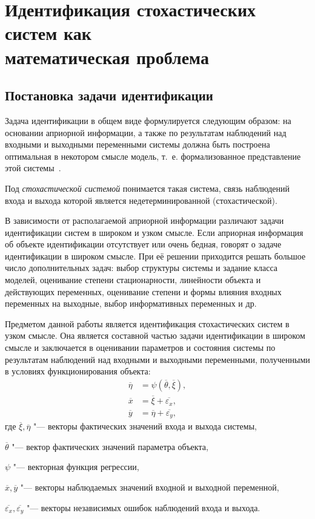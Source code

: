 \section[Идентификация стохастических систем как математическая проблема]{%
  Идентификация стохастических систем как \\
  математическая проблема}

\subsection{Постановка задачи идентификации}

Задача идентификации в общем виде формулируется следующим образом:
на основании априорной информации, а также по результатам наблюдений над
входными и выходными переменными системы должна быть построена оптимальная в
некотором смысле модель, т.~е. формализованное представление этой системы~\cite{eikhoff_1975}.

Под \emph{стохастической системой} понимается такая система,
связь наблюдений входа и выхода которой является недетерминированной (стохастической).

В зависимости от располагаемой априорной информации различают
задачи идентификации систем в широком и узком смысле.
Если априорная информация об объекте идентификации отсутствует
или очень бедная, говорят о задаче идентификации в широком смысле.
При её решении приходится решать большое число дополнительных задач:
выбор структуры системы и задание класса моделей,
оценивание степени стационарности, линейности объекта и действующих переменных,
оценивание степени и формы влияния входных переменных на выходные,
выбор информативных переменных и др.

Предметом данной работы является идентификация стохастических систем в узком смысле.
Она является составной частью задачи идентификации в широком смысле
и заключается в оценивании параметров и состояния системы по результатам
наблюдений над входными и выходными переменными, полученными в условиях функционирования объекта:
\begin{equation}
  \label{eq:model_general}
  \begin{aligned}
    \overline{\eta} &= \psi (\overline{\theta}, \overline{\xi}), \\
    \overline{x} &= \overline{\xi} + \overline{\varepsilon_x}, \\
    \overline{y} &= \overline{\eta} + \overline{\varepsilon_y},
  \end{aligned}
\end{equation}
где \( \overline{\xi}, \overline{\eta} \)
"--- векторы фактических значений входа и выхода системы, \par
\( \overline{\theta} \)
"--- вектор фактических значений параметра объекта, \par
\( \psi \)
"--- векторная функция регрессии, \par
\( \overline{x}, \overline{y} \)
"--- векторы наблюдаемых значений входной и выходной переменной, \par
\( \overline{\varepsilon_x}, \overline{\varepsilon_y} \)
"--- векторы независимых ошибок наблюдений входа и выхода.

